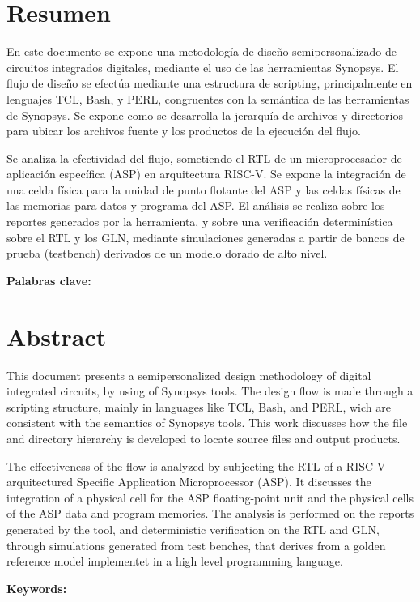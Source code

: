 \chapter*{Resumen}
En este documento se expone una metodología de diseño semipersonalizado de circuitos integrados digitales, mediante el uso de las herramientas Synopsys. El flujo de diseño se efectúa mediante una estructura de scripting, principalmente en lenguajes TCL, Bash, y PERL, congruentes con la semántica de las herramientas de Synopsys. Se expone como se desarrolla la jerarquía de archivos y directorios para ubicar los archivos fuente y los productos de la ejecución del flujo.

Se analiza la efectividad del flujo, sometiendo el RTL de un microprocesador de aplicación específica (ASP) en arquitectura RISC-V. Se expone la integración de una celda física para la unidad de punto flotante del ASP y las celdas físicas de las memorias para datos y programa del ASP. El análisis se realiza sobre los reportes generados por la herramienta, y sobre una verificación determinística sobre el RTL y los GLN, mediante simulaciones generadas a partir de bancos de prueba (testbench) derivados de un modelo dorado de alto nivel.


\bigskip

\textbf{Palabras clave:} \scriptKeywords

\clearpage
\chapter*{Abstract}
\thispagestyle{empty}

This document presents a semipersonalized design methodology of digital integrated circuits, by using of Synopsys tools. The design flow is made through a scripting structure, mainly in languages like TCL, Bash, and PERL, wich are consistent with the semantics of Synopsys tools. This work discusses how the file and directory hierarchy is developed to locate source files and output products.

The effectiveness of the flow is analyzed by subjecting the RTL of a RISC-V arquitectured Specific Application Microprocessor (ASP). It discusses the integration of a physical cell for the ASP floating-point unit and the physical cells of the ASP data and program memories. The analysis is performed on the reports generated by the tool, and deterministic verification on the RTL and GLN, through simulations generated from test benches, that derives from a golden reference model implementet in a high level programming language.

\bigskip

\textbf{Keywords:} \scriptKeywords 

\cleardoublepage

